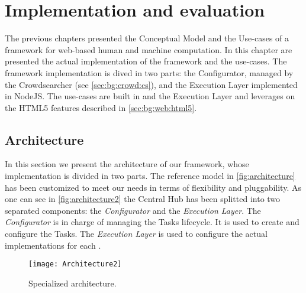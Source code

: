 

\chapter{Implementation and evaluation}
\label{cap:implementation}

The previous chapters presented the Conceptual Model and the Use-cases of a
framework for web-based human and machine computation. In this chapter are
presented the actual implementation of the framework and the use-cases.
The framework implementation is dived in two parts: the Configurator, managed by
the Crowdsearcher (see \autoref{sec:bg:crowd:cs}), and the Execution Layer
implemented in NodeJS.
The use-cases are built in \js{} and  the Execution Layer and leverages on
the \ac{HTML}5 features described in \autoref{sec:bg:web:html5}.

\section{Architecture}
\label{sec:implementation:arch}
In this section we present the architecture of our framework, whose implementation
is divided in two parts. The reference model in \autoref{fig:architecture} has
been customized to meet our needs in terms of flexibility and pluggability.
As one can see in \autoref{fig:architecture2} the Central Hub has been splitted
into two separated components: the \emph{Configurator} and the \emph{Execution Layer}.
The \emph{Configurator} is in charge of managing the Tasks lifecycle. It is used
to create and configure the Tasks.
The \emph{Execution Layer} is used to configure the actual implementations for
each \utask{}.

\begin{figure}[htb]
    \centering
    \texttt{[image: Architecture2]}
    \caption{Specialized architecture.}
    \label{fig:architecture2}
\end{figure}

